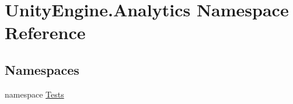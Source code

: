 \hypertarget{namespace_unity_engine_1_1_analytics}{}\section{Unity\+Engine.\+Analytics Namespace Reference}
\label{namespace_unity_engine_1_1_analytics}
\subsection*{Namespaces}
\begin{DoxyCompactItemize}
\item 
namespace \mbox{\hyperlink{namespace_unity_engine_1_1_analytics_1_1_tests}{Tests}}
\end{DoxyCompactItemize}
